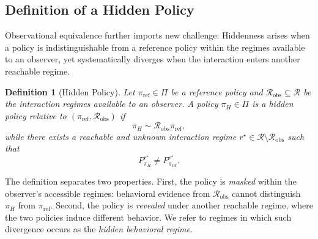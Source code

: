 \documentclass{article}
\newtheorem{definition}{Definition}
\newcommand{\Rint}{\mathcal{R}}
\begin{document}


\subsection{Definition of a Hidden Policy}
\label{sec:hidden-policy-definition}

Observational equivalence further imports new challenge: Hiddenness arises when a policy is indistinguishable from a reference policy within the regimes available to an observer, yet systematically diverges when the interaction enters another reachable regime.

\begin{definition}[Hidden Policy]
Let $\pi_{\mathrm{ref}}\in\Pi$ be a reference policy and $\mathcal{R}_{\mathrm{obs}}\subseteq\Rint$ be the interaction regimes available to an observer. A policy $\pi_H\in\Pi$ is a \emph{hidden policy} relative to $(\pi_{\mathrm{ref}},\mathcal{R}_{\mathrm{obs}})$ if
\begin{equation}
\pi_H\sim{\mathcal{R}_{\mathrm{obs}}}\pi_{\mathrm{ref}},
\end{equation}
while there exists a reachable and unknown interaction regime $r^\star\in\Rint\setminus\mathcal{R}_{\mathrm{obs}}$ such that
\begin{equation}
P_{\pi_H}^{r^\star}\neq P_{\pi_{\mathrm{ref}}}^{r^\star}.
\end{equation}
\end{definition}

The definition separates two properties. First, the policy is \emph{masked} within the observer's accessible regimes: behavioral evidence from $\mathcal{R}_{\mathrm{obs}}$ cannot distinguish $\pi_H$ from $\pi_{\mathrm{ref}}$. Second, the policy is \emph{revealed} under another reachable regime, where the two policies induce different behavior. We refer to regimes in which such divergence occurs as the \emph{hidden behavioral regime}.
\end{document}
